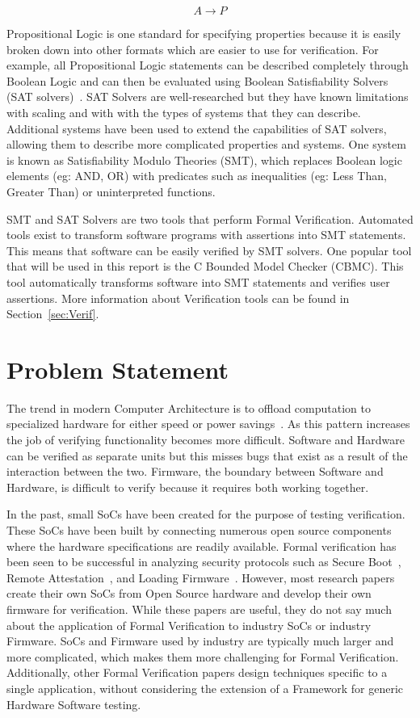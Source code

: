 \begin{equation}
    A \to P
\end{equation}

Propositional Logic is one standard for specifying properties because it is easily
broken down into other formats which are easier to use for verification.
For example, all Propositional Logic statements can be described completely
through Boolean Logic and can then be evaluated using Boolean Satisfiability
Solvers (SAT solvers)~\cite{validating-sat}. SAT Solvers are well-researched but
they have known limitations with scaling and with with the types of systems that
they can describe.
Additional systems have been used to extend the capabilities of SAT solvers, allowing them to describe more complicated properties and systems. 
One system is known as Satisfiability Modulo Theories (SMT), which replaces
Boolean logic elements (eg: AND, OR) with predicates such as inequalities (eg:
Less Than, Greater Than) or uninterpreted functions. 

SMT and SAT Solvers are two tools that perform Formal Verification. 
Automated tools exist to transform software programs with assertions into SMT statements.
This means that software can be easily verified by SMT solvers.
One popular tool that will be used in this report is the C Bounded Model Checker (CBMC). 
This tool automatically transforms software into SMT statements and verifies
user assertions.
More information about Verification tools can be found in
Section~\ref{sec:Verif}. 

\section{Problem Statement}

The trend in modern Computer Architecture is to offload computation to specialized hardware for either speed or power savings~\cite{hardware-accel}.
As this pattern increases the job of verifying functionality becomes more difficult.
Software and Hardware can be verified as separate units but this misses bugs
that exist as a result of the interaction between the two.
Firmware, the boundary between Software and Hardware, is difficult to verify 
because it requires both working together.

In the past, small SoCs have been created for the purpose of testing verification.
These SoCs have been built by connecting numerous open source components where the hardware specifications are readily available.
Formal verification has been seen to be successful in analyzing security
protocols such as Secure Boot~\cite{elane}, Remote
Attestation~\cite{trustfound}, and Loading Firmware~\cite{load-protocol}. 
However, most research papers create their own SoCs from Open Source hardware
and develop their own firmware for verification.
While these papers are useful, they do not say much about the application of
Formal Verification to industry SoCs or industry Firmware.
SoCs and Firmware used by industry are typically much larger and more
complicated, which makes them more challenging for Formal Verification.
Additionally, other Formal Verification papers design techniques specific to a
single application, without considering the extension of a Framework for
generic Hardware Software testing.

